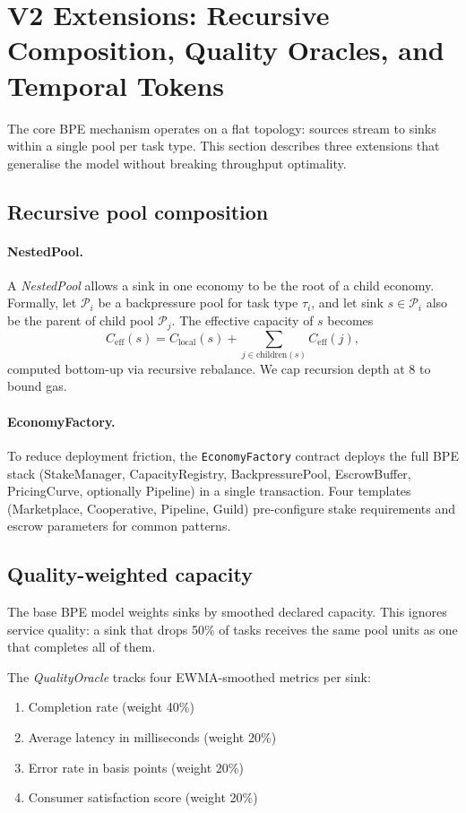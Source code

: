 \section{V2 Extensions: Recursive Composition, Quality Oracles, and Temporal Tokens}
\label{sec:extensions}

The core BPE mechanism operates on a flat topology: sources stream to sinks within
a single pool per task type. This section describes three extensions that generalise
the model without breaking throughput optimality.

\subsection{Recursive pool composition}

\paragraph{NestedPool.}
A \emph{NestedPool} allows a sink in one economy to be the root of a child economy.
Formally, let $\mathcal{P}_i$ be a backpressure pool for task type $\tau_i$, and let
sink $s \in \mathcal{P}_i$ also be the parent of child pool $\mathcal{P}_j$. The
effective capacity of $s$ becomes
\[
  C_{\text{eff}}(s) = C_{\text{local}}(s) + \sum_{j \in \text{children}(s)} C_{\text{eff}}(j),
\]
computed bottom-up via recursive rebalance. We cap recursion depth at 8 to bound gas.

\paragraph{EconomyFactory.}
To reduce deployment friction, the \texttt{EconomyFactory} contract deploys the full
BPE stack (StakeManager, CapacityRegistry, BackpressurePool, EscrowBuffer, PricingCurve,
optionally Pipeline) in a single transaction. Four templates (Marketplace, Cooperative,
Pipeline, Guild) pre-configure stake requirements and escrow parameters for common patterns.

\subsection{Quality-weighted capacity}

The base BPE model weights sinks by smoothed declared capacity. This ignores
service quality: a sink that drops 50\% of tasks receives the same pool units
as one that completes all of them.

The \emph{QualityOracle} tracks four EWMA-smoothed metrics per sink:
\begin{enumerate}
  \item Completion rate (weight 40\%)
  \item Average latency in milliseconds (weight 20\%)
  \item Error rate in basis points (weight 20\%)
  \item Consumer satisfaction score (weight 20\%)
\end{enumerate}

